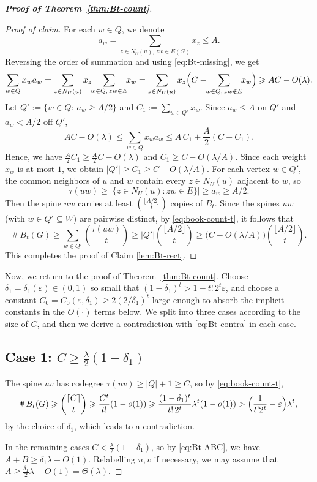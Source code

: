 \documentclass[11pt,a4paper]{article}
\theoremstyle{definition}
\theoremstyle{plain}
\renewcommand{\le}{\leqslant}
\renewcommand{\ge}{\geqslant}
\begin{document}
\begin{proof}[{\bf Proof of Theorem~\ref{thm:Bt-count}}]
\begin{proof}[Proof of claim]
For each $w\in Q$, we denote 
$$ a_w=\sum_{z\in N_U(u),\,zw\in E(G)}x_z\le A. $$ 
Reversing the
order of summation and using \eqref{eq:Bt-missing}, we get 
\[
   \sum_{w\in Q}x_w a_w
   =\sum_{z\in N_U(u)}x_z\!\!\sum_{w\in Q,\,zw\in E}\!\!x_w
   =\sum_{z\in N_U(u)}x_z\Bigl(C-\!\!\sum_{w\in Q,\,zw\notin E}\!\!x_w\Bigr)
   \ge AC-O(\lambda).
\]
Let $Q':=\{w\in Q:\ a_w\ge A/2\}$ and $C_1:=\sum_{w\in Q'}x_w$.  Since $a_w\le A$
on $Q'$ and $a_w<A/2$ off $Q'$,
$$ 
AC-O(\lambda)\le \sum_{w\in Q} x_w a_w \le  A\,C_1+\frac A2(C-C_1). 
$$ 
Hence, we have 
$\tfrac A2 C_1\ge\tfrac A2 C-O(\lambda)$ and $C_1\ge C-O(\lambda/A)$. Since each
weight $x_w$ is at most $1$, we obtain $|Q'|\ge C_1\ge C-O(\lambda/A)$.  For each vertex $w\in Q'$, the
common neighbors of $u$ and $w$ contain every $z\in N_U(u)$ adjacent to $w$, so
$$ \tau(uw)\ge |\{z\in N_U(u):zw\in E\}| \ge a_w\ge A/2. $$ 
Then the spine $uw$ carries
at least $\binom{\lfloor A/2\rfloor}{t}$ copies of $B_t$. Since the spines $uw$
(with $w\in Q'\subseteq W$) are pairwise distinct, by \eqref{eq:book-count-t}, 
it follows that 
\[
   \texttt{\#}\,B_t(G)\ge\sum_{w\in Q'}\binom{\tau(uw)}{t}
   \ge|Q'|\binom{\lfloor A/2\rfloor}{t}
   \ge\bigl(C-O(\lambda/A)\bigr)\binom{\lfloor A/2\rfloor}{t}. 
\]
This completes the proof of Claim \ref{lem:Bt-rect}. 
\end{proof}

Now, we return to the proof of Theorem~\ref{thm:Bt-count}.   
Choose $\delta_1=\delta_1(\varepsilon)\in(0,1)$ so
small that $(1-\delta_1)^t>1-t!\,2^t\varepsilon$,
and choose a constant
$C_0=C_0(\varepsilon,\delta_1)\ge 2(2/\delta_1)^t$
large enough to absorb the implicit constants in the $O(\cdot)$ terms below.
 We split into three cases according to the size of
$C$, and then we derive a contradiction with \eqref{eq:Bt-contra} in each case.

\subsection*{Case 1:  
$C\ge\tfrac\lambda2(1-\delta_1)$}   

The spine $uv$ has codegree
$\tau(uv)\ge|Q|+1\ge C$, so by \eqref{eq:book-count-t},
\[
   \texttt{\#}\,B_t(G)\ge\binom{\lceil C\rceil}{t}\ge\frac{C^t}{t!}(1-o(1))
   \ge\frac{(1-\delta_1)^t}{t!\,2^t}\lambda^t(1-o(1))
   >\Bigl(\frac1{t!2^t}-\varepsilon\Bigr)\lambda^t,
\]
by the choice of $\delta_1$, which leads to a contradiction.

\medskip 
In the remaining cases $C<\tfrac\lambda2(1-\delta_1)$, so by \eqref{eq:Bt-ABC}, we have 
$A+B\ge\delta_1\lambda-O(1)$. Relabelling $u,v$ if necessary, we may assume that 
$A\ge\tfrac{\delta_1}{2}\lambda-O(1)=\Theta(\lambda)$.


\end{proof}
\end{document}

